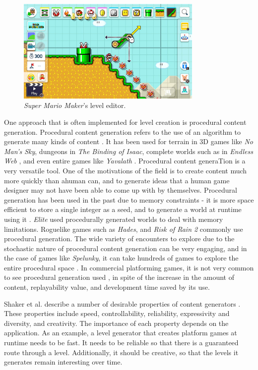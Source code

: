 \begin{figure}[ht]
    \centering
    \includegraphics[width=0.8\textwidth]{img/fig1-mm-editor.jpg}
    \caption{\emph{Super Mario Maker}'s level editor.}
    \label{fig:mm-editor}
\end{figure}

One approach that is often implemented for level creation is procedural content generation.
Procedural content generation refers to the use of an algorithm to generate many kinds of
content \cite{shaker2016}. It has been used for terrain in 3D games like 
\emph{No Man's Sky}, dungeons in \emph{The Binding of Isaac}, complete worlds such as in
\emph{Endless Web} \cite{smith2013}, and even entire games like \emph{Yavalath}
\cite{browne2011}. Procedural content generaTion is a very versatile tool. One of the
motivations of the field is to create content much more quickly than ahuman can, and to
generate ideas that a human game designer may not have been able to come up with by
themselves. Procedural generation has been used in the past due to memory constraints - it
is more space efficient to store a single integer as a seed, and to generate a world at
runtime using it \cite{shaker2012}. \emph{Elite} used procedurally generated worlds to deal
with memory limitations. Roguelike games such as \emph{Hades}, and \emph{Risk of Rain 2}
commonly use procedural generation. The wide variety of encounters to explore due to the
stochastic nature of procedural content generation can be very engaging, and in the case of
games like \emph{Spelunky}, it can take hundreds of games to explore the entire procedural
space \cite{kazemi2009b}. In commercial platforming games, it is not very common to see
procedural generation used \cite{compton2006}, in spite of the increase in the amount of
content, replayability value, and development time saved by its use.

Shaker et al. describe a number of desirable properties of content generators \cite[6-7]{shaker2016}.
These properties include speed, controllability, reliability, expressivity and diversity,
and creativity. The importance of each property depends on the application. As an example,
a level generator that creates platform games at runtime needs to be fast. It needs to be
reliable so that there is a guaranteed route through a level. Additionally, it should be
creative, so that the levels it generates remain interesting over time.

